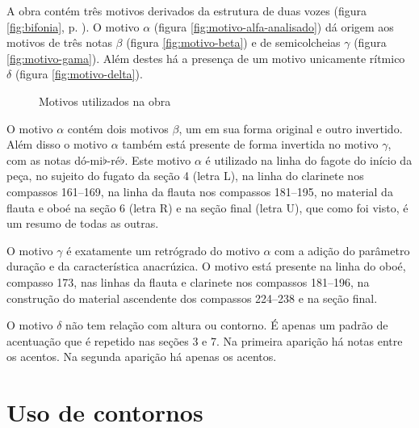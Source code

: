 A obra contém três motivos derivados da estrutura de duas vozes
(figura \ref{fig:bifonia}, p. \pageref{fig:bifonia}). O motivo
$\alpha$ (figura \ref{fig:motivo-alfa-analisado}) dá origem aos
motivos de três notas $\beta$ (figura \ref{fig:motivo-beta}) e de
semicolcheias $\gamma$ (figura \ref{fig:motivo-gama}). Além destes há
a presença de um motivo unicamente rítmico $\delta$ (figura
\ref{fig:motivo-delta}).

\begin{figure}
  \centering


  \caption{Motivos utilizados na obra}
  \label{fig:motivos-utilizados}
\end{figure}

O motivo $\alpha$ contém dois motivos $\beta$, um em sua forma
original e outro invertido. Além disso o motivo $\alpha$ também está
presente de forma invertida no motivo $\gamma$, com as notas
dó-mi$\flat$-ré$\flat$. Este motivo $\alpha$ é utilizado na linha do
fagote do início da peça, no sujeito do fugato da seção 4 (letra L),
na linha do clarinete nos compassos 161--169, na linha da flauta nos
compassos 181--195, no material da flauta e oboé na seção 6 (letra R)
e na seção final (letra U), que como foi visto, é um resumo de todas
as outras.

O motivo $\gamma$ é exatamente um retrógrado do motivo $\alpha$ com a
adição do parâmetro duração e da característica anacrúzica. O motivo
está presente na linha do oboé, compasso 173, nas linhas da flauta e
clarinete nos compassos 181--196, na construção do material ascendente
dos compassos 224--238 e na seção final.

O motivo $\delta$ não tem relação com altura ou contorno. É apenas um
padrão de acentuação que é repetido nas seções 3 e 7. Na primeira
aparição há notas  entre os acentos. Na segunda aparição
há apenas os acentos.

\section{Uso de contornos}
\label{sec:uso-de-contornos}

